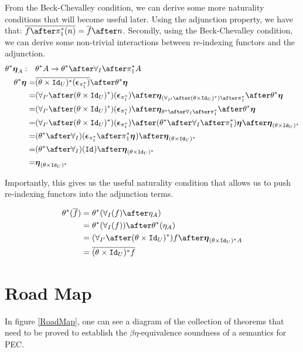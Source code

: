 \documentclass{Report}
\begin{document}
From the Beck-Chevalley condition, we can derive some more naturality conditions that will become useful later.
Using the adjunction property, we have that: $\bar{f\after\pstar(n)} = \bar{f}\after n$. Secondly, using the Beck-Chevalley condition, we can derive some non-trivial interactions between re-indexing functors and the adjunction.  
    \begin{align}
        \theta\star\unit{A}:\quad&\theta\star A \rightarrow \theta\star\after\allI\after\pstar A\\
        \theta\star\unit{} =& \bar{(\theta\times\Id{U})\star(\counit{\pstar})}\after\theta\star\unit{}\\
        =& (\allII\after(\theta\times\Id{U})\star)(\counit{\pstar})\after\unit{(\allII\after(\theta\times\Id{U})\star)\after\pstar}\after\theta\star\unit{}\\
        = & (\allII\after(\theta\times\Id{U})\star)(\counit{\pstar})\after\unit{\theta\star\after\allI\after\pstar}\after\theta\star\unit{}\\
        = & (\allII\after(\theta\times\Id{U})\star)(\counit{\pstar}) \after(\theta\star\after\allI\after\pstar)\unit{} \after\unit{(\theta\times\Id{U})\star}\\
        = & (\theta\star\after\allI)(\counit{\pstar}
        \after\pstar\unit{})\after\unit{(\theta\times\Id{U})\star}\\
        = & (\theta\star\after\allI)(\Id{})\after\unit{(\theta\times\Id{U})\star}\\
        = & \unit{(\theta\times\Id{U})\star}
    \end{align}

    Importantly, this gives us the useful naturality condition that allows us to push re-indexing functors into the adjunction terms.

    \begin{align}\label{NaturalityCondition}
        \theta\star(\bar{f}) & = \theta\star(\allI(f)\after\eta_A)\\
        & = \theta\star(\allI(f))\after\theta\star(\eta_A)\\
        & =  (\allII\after(\theta\times\Id{U})\star)f \after\unit{(\theta\times\Id{U})\star A}\\
        & = \bar{(\theta\times\Id{U})\star f}\\
    \end{align}

\section{Road Map}
In figure \ref{RoadMap}, one can see a diagram of the collection of theorems that need to be proved to establish the $\beta\eta$-equivalence soundness of a semantics for PEC.
\end{document}
